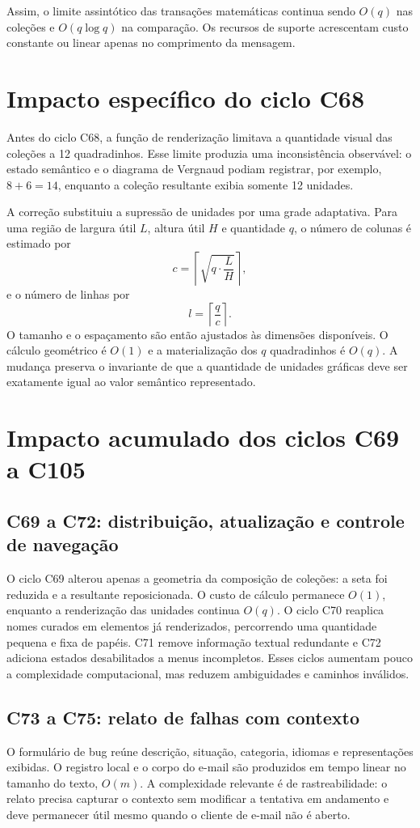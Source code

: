 \documentclass[12pt,a4paper]{article}
\begin{document}
Assim, o limite assintótico das transações matemáticas continua sendo $O(q)$ nas coleções e $O(q\log q)$ na comparação. Os recursos de suporte acrescentam custo constante ou linear apenas no comprimento da mensagem.

\section{Impacto específico do ciclo C68}

Antes do ciclo C68, a função de renderização limitava a quantidade visual das coleções a 12 quadradinhos. Esse limite produzia uma inconsistência observável: o estado semântico e o diagrama de Vergnaud podiam registrar, por exemplo, $8+6=14$, enquanto a coleção resultante exibia somente 12 unidades.

A correção substituiu a supressão de unidades por uma grade adaptativa. Para uma região de largura útil $L$, altura útil $H$ e quantidade $q$, o número de colunas é estimado por
\[
c=\left\lceil\sqrt{q\cdot\frac{L}{H}}\right\rceil,
\]
e o número de linhas por
\[
l=\left\lceil\frac{q}{c}\right\rceil.
\]
O tamanho e o espaçamento são então ajustados às dimensões disponíveis. O cálculo geométrico é $O(1)$ e a materialização dos $q$ quadradinhos é $O(q)$. A mudança preserva o invariante de que a quantidade de unidades gráficas deve ser exatamente igual ao valor semântico representado.


\section{Impacto acumulado dos ciclos C69 a C105}

\subsection{C69 a C72: distribuição, atualização e controle de navegação}
O ciclo C69 alterou apenas a geometria da composição de coleções: a seta foi reduzida e a resultante reposicionada. O custo de cálculo permanece $O(1)$, enquanto a renderização das unidades continua $O(q)$. O ciclo C70 reaplica nomes curados em elementos já renderizados, percorrendo uma quantidade pequena e fixa de papéis. C71 remove informação textual redundante e C72 adiciona estados desabilitados a menus incompletos. Esses ciclos aumentam pouco a complexidade computacional, mas reduzem ambiguidades e caminhos inválidos.

\subsection{C73 a C75: relato de falhas com contexto}
O formulário de bug reúne descrição, situação, categoria, idiomas e representações exibidas. O registro local e o corpo do e-mail são produzidos em tempo linear no tamanho do texto, $O(m)$. A complexidade relevante é de rastreabilidade: o relato precisa capturar o contexto sem modificar a tentativa em andamento e deve permanecer útil mesmo quando o cliente de e-mail não é aberto.
\end{document}
